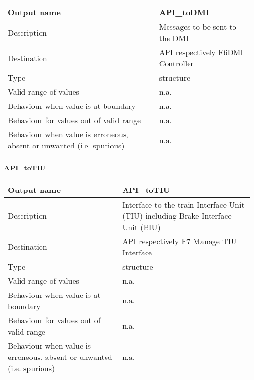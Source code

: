 \begin{longtable}{p{}p{}}
\toprule
Output name				& API\_toDMI \\
\midrule
Description				& Messages to be sent to the DMI \\
\midrule
Destination				& API respectively F6DMI Controller \\ 
\midrule
Type					& structure\\
\midrule
Valid range of values	& n.a. \\
\midrule
Behaviour when value is at boundary	& n.a. \\
\midrule
Behaviour for values out of valid range	& n.a.\\
\midrule
Behaviour when value is erroneous, absent or unwanted (i.e. spurious) & n.a.\\
\bottomrule
\end{longtable}

\paragraph{API\_toTIU}

\begin{longtable}{p{}p{}}
\toprule
Output name				& API\_toTIU \\
\midrule
Description				& Interface to the train Interface Unit (TIU) including Brake Interface Unit (BIU) \\
\midrule
Destination				& API respectively F7 Manage TIU Interface \\ 
\midrule
Type					& structure \\
\midrule
Valid range of values	& n.a. \\
\midrule
Behaviour when value is at boundary	& n.a. \\
\midrule
Behaviour for values out of valid range	& n.a.\\
\midrule
Behaviour when value is erroneous, absent or unwanted (i.e. spurious) & n.a. \\
\bottomrule
\end{longtable}
